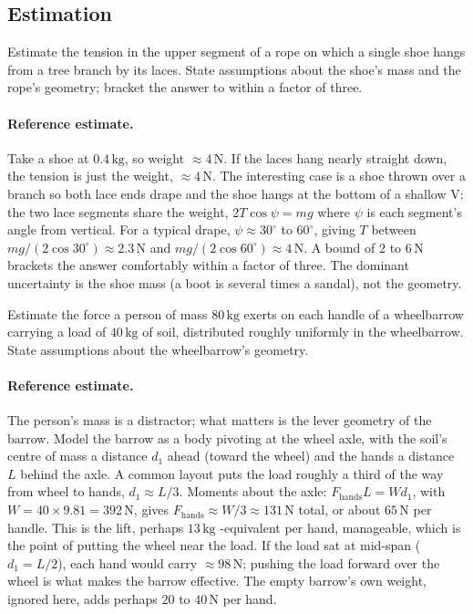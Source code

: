 \subsection*{Estimation}

\begin{exercise}
Estimate the tension in the upper segment of a rope on which a
single shoe hangs from a tree branch by its laces. State assumptions
about the shoe's mass and the rope's geometry; bracket the answer
to within a factor of three.
\paragraph{Reference estimate.} Take a shoe at $0.4\,\si{\kilogram}$, so
weight $\approx 4\,\text{N}$. If the laces hang nearly straight down,
the tension is just the weight, $\approx 4\,\text{N}$. The interesting
case is a shoe thrown over a branch so both lace ends drape and the shoe
hangs at the bottom of a shallow V: the two lace segments share the
weight, $2T\cos\psi = mg$ where $\psi$ is each segment's angle from
vertical. For a typical drape, $\psi \approx 30^{\circ}$ to
$60^{\circ}$, giving $T$ between $mg/(2\cos 30^{\circ}) \approx
2.3\,\text{N}$ and $mg/(2\cos 60^{\circ}) \approx 4\,\text{N}$. A bound
of $2$ to $6\,\text{N}$ brackets the answer comfortably within a factor
of three. The dominant uncertainty is the shoe mass (a boot is several
times a sandal), not the geometry.
\end{exercise}

\begin{exercise}
Estimate the force a person of mass $80\,\si{\kilogram}$ exerts on
each handle of a wheelbarrow carrying a load of $40\,\si{\kilogram}$
of soil, distributed roughly uniformly in the wheelbarrow. State
assumptions about the wheelbarrow's geometry.
\paragraph{Reference estimate.} The person's mass is a distractor; what
matters is the lever geometry of the barrow. Model the barrow as a body
pivoting at the wheel axle, with the soil's centre of mass a distance
$d_1$ ahead (toward the wheel) and the hands a distance $L$ behind the
axle. A common layout puts the load roughly a third of the way from
wheel to hands, $d_1 \approx L/3$. Moments about the axle: $F_{\text{
hands}} L = W d_1$, with $W = 40 \times 9.81 = 392\,\text{N}$, gives
$F_{\text{hands}} \approx W/3 \approx 131\,\text{N}$ total, or about
$65\,\text{N}$ per handle. This is the lift, perhaps $13\,\si{\kilogram}$
-equivalent per hand, manageable, which is the point of putting the
wheel near the load. If the load sat at mid-span ($d_1 = L/2$), each
hand would carry $\approx 98\,\text{N}$; pushing the load forward over
the wheel is what makes the barrow effective. The empty barrow's own
weight, ignored here, adds perhaps $20$ to $40\,\text{N}$ per hand.
\end{exercise}

